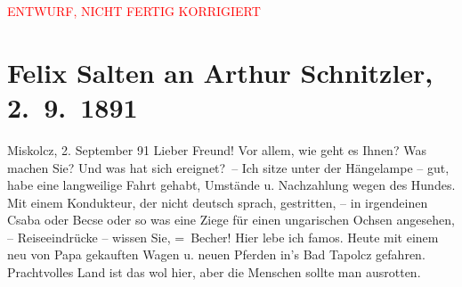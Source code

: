 
\begin{center}
            \textcolor{red}{ENTWURF, NICHT FERTIG KORRIGIERT}
                      \end{center}
            
         
         \renewcommand{\erwaehntePersonen}{Personen:  ?? [Partnerin von Paul Goldmann und später Felix Salten], Paula Makay, Philipp Salzmann, Michael Emil Salzmann, Ignaz Salzmann, Theodor Salzmann, Geza Sós}
         \renewcommand{\erwaehnteInstitutionen}{Institutionen: Danzer’s Orpheum}
         \renewcommand{\erwaehnteOrte}{Orte: Miskolc, Miskolctapolca, Mödling, Wien}
         \renewcommand{\erwaehnteWerke}{}
               \section[Felix Salten an Arthur Schnitzler, 2. 9. 1891]{ Felix Salten an Arthur Schnitzler, 2. 9. 1891}\nopagebreak{}\rehead{ }\begin{ledgroupsized}[t]{13cm}\normalsize\beginnumbering \toendnotes[C]{\smallbreak\pagebreak[2]} 
\toendnotes[C]{\smallbreak}\pstart
           {\pb}Miskolcz, 2. September 91\pend
           \pstart
           Lieber Freund! Vor allem, wie geht es Ihnen? Was machen Sie? Und was
               hat sich ereignet? –\pend
           \pstart
           Ich sitze unter der Hängelampe – gut, habe eine langweilige Fahrt gehabt, Umstände u.
               Nachzahlung wegen des Hundes. Mit einem Kondukteur, der nicht deutsch sprach,
               gestritten, – in irgendeinen Csaba oder Becse oder so was eine Ziege für einen
               ungarischen Ochsen angesehen, – Reiseeindrücke – wissen Sie, = Becher!\pend
           \pstart
           {\pb}Hier lebe ich famos. Heute mit
               einem neu von Papa
               gekauften Wagen u. neuen Pferden in’s Bad
                  Tapolcz gefahren. Prachtvolles Land ist das wol hier, aber die Menschen
               sollte man ausrotten. \pend
           \pstart

\end{ledgroupsized}
